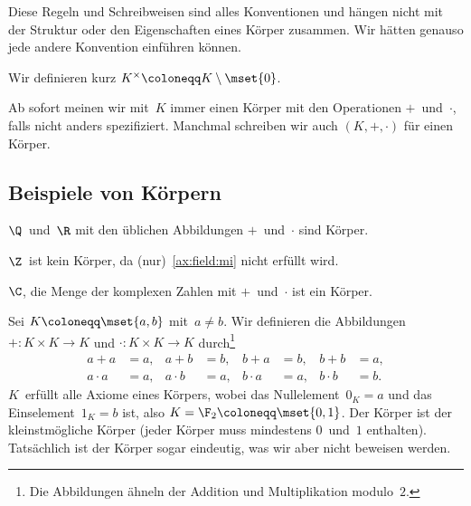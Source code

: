 \documentclass[a4paper]{article}
\begin{document}
Diese Regeln und Schreibweisen sind alles Konventionen und hängen nicht mit der Struktur oder den Eigenschaften eines Körper zusammen. Wir hätten genauso jede andere Konvention einführen können.

\begin{notation}
    Wir definieren kurz $K^\times \coloneqq K \setminus \mset{0}$.
\end{notation}

Ab sofort meinen wir mit~$K$ immer einen Körper mit den Operationen $+$~und~$\cdot$, falls nicht anders spezifiziert. Manchmal schreiben wir auch $(K, +, \cdot)$ für einen Körper.

\subsection{Beispiele von Körpern}

\begin{example}
    $\Q$~und~$\R$ mit den üblichen Abbildungen $+$~und~$\cdot$ sind Körper.
\end{example}

\begin{example}
    $\Z$~ist kein Körper, da (nur)~\ref{ax:field:mi} nicht erfüllt wird.
\end{example}

\begin{example}
    $\C$, die Menge der komplexen Zahlen mit $+$~und~$\cdot$ ist ein Körper.
\end{example}

\begin{example}
    Sei $K \coloneqq \mset{a, b}$ mit~$a \neq b$. Wir definieren die Abbildungen $+\colon K \times K \to K$ und $\cdot\colon K \times K \to K$ durch\footnote{Die Abbildungen ähneln der Addition und Multiplikation modulo~$2$.}
    \begin{align*}
        a + a &= a, & a + b &= b, & b + a &= b, & b + b &= a, \\
        a \cdot a &= a, & a \cdot b &= a, & b \cdot a &= a, & b \cdot b &= b.
    \end{align*}
    $K$~erfüllt alle Axiome eines Körpers, wobei das Nullelement~$0_K = a$ und das Einselement~$1_K = b$ ist, also $K = \F_2 \coloneqq \mset{0, 1}$. Der Körper ist der kleinstmögliche Körper (jeder Körper muss mindestens $0$~und~$1$ enthalten). Tatsächlich ist der Körper sogar eindeutig, was wir aber nicht beweisen werden.
\end{example}
\end{document}

